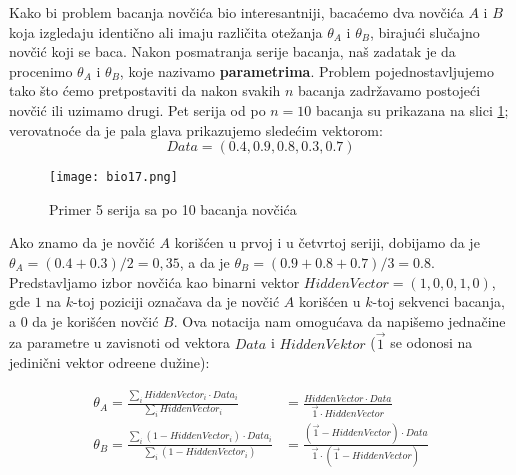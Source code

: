 Kako bi problem bacanja novčića bio interesantniji, bacaćemo dva novčića $A$ i $B$ koja izgledaju identično ali imaju različita otežanja $\theta_A$ i $\theta_B$, birajući slučajno novčić koji se baca. Nakon posmatranja serije bacanja, naš zadatak je da procenimo $\theta_A$ i $\theta_B$, koje nazivamo \textbf{parametrima}. Problem pojednostavljujemo tako što ćemo pretpostaviti da nakon svakih $n$ bacanja zadržavamo postojeći novčić ili uzimamo drugi. Pet serija od po $n = 10$ bacanja su prikazana na slici \ref{slika 17}; verovatnoće da je pala glava prikazujemo sledećim vektorom:
$$
Data = (0.4, 0.9, 0.8, 0.3, 0.7)
$$
\begin{figure}[h!]
    \centering
    \texttt{[image: bio17.png]}
    \caption{Primer 5 serija sa po 10 bacanja novčića}
    \label{slika 17}
\end{figure}

Ako znamo da je novčić $A$ korišćen u prvoj i u četvrtoj seriji, dobijamo da je $\theta_A=(0.4+0.3)/2=0,35$, a da je $\theta_B=(0.9+0.8+0.7)/3=0.8$. Predstavljamo izbor novčića kao binarni vektor $HiddenVector=(1,0,0,1,0)$, gde $1$ na $k$-toj poziciji označava da je novčić $A$ korišćen u $k$-toj sekvenci bacanja, a $0$ da je korišćen novčić $B$. Ova notacija nam omogućava da napišemo jednačine za parametre u zavisnoti od vektora $Data$ i $HiddenVektor$ ($\overrightarrow{1}$ se odonosi na jedinični vektor odre\dj ene dužine):

\begin{equation}
\label{eq2}
\begin{split}
\theta_A = \frac{\sum_i HiddenVector_i \cdot Data_i}{\sum_i HiddenVector_i} & = 
\frac{HiddenVector \cdot Data}{\overrightarrow{1} \cdot HiddenVector} \\
\theta_B = \frac{\sum_i (1-HiddenVector_i) \cdot Data_i}{\sum_i (1-HiddenVector_i)} & =
\frac{(\overrightarrow{1} - HiddenVector) \cdot Data}{\overrightarrow{1} \cdot (\overrightarrow{1} - HiddenVector)}
\end{split}
\end{equation}


